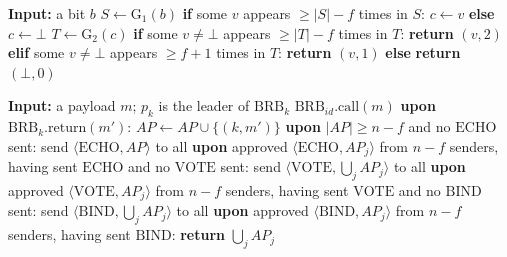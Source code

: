 \begin{algorithm}
    \caption{The two-gather graded agreement, Algorithm~4 of Attiya, Flam and
      Welch \cite{AFW25} in its case $R \ge 2$, at $R = 2$, with the grade
      computed from the second gather's counts in place of the
      approximate-agreement subroutine of its lines~7 and~8 (D24).
      G is a gather instance; the first carries bits, the second carries
      bits-or-$\bot$.}
    \label{alg:gbca-gather}
    \begin{algorithmic}
        \State \textbf{Input:} a bit $b$
        \medskip
        \State $S \gets \mathrm{G}_1(b)$
        \State \textbf{if} some $v$ appears $\ge |S| - f$ times in $S$:
          $c \gets v$ \textbf{else} $c \gets \bot$
        \State $T \gets \mathrm{G}_2(c)$
        \State \textbf{if} some $v \ne \bot$ appears $\ge |T| - f$ times in $T$:
          \textbf{return} $(v, 2)$
        \State \textbf{elif} some $v \ne \bot$ appears $\ge f + 1$ times in $T$:
          \textbf{return} $(v, 1)$ 
        \State \textbf{else} \textbf{return} $(\bot, 0)$
    \end{algorithmic}
\end{algorithm}

\begin{algorithm}
    \caption{The gather implementation, Algorithm~4 of the source
      blueprint~\cite{LeslieBP}, which is Algorithm~5 of \cite{AFW25} in its
      binding form: the $\mathrm{ECHO}$, $\mathrm{VOTE}$ and $\mathrm{BIND}$
      sends and the return are that algorithm's phases~2, 3 and~4 and its
      output, where the non-binding form stops one phase earlier.
      $n$ reliable-broadcast instances carry the inputs; $\mathrm{ECHO}$,
      $\mathrm{VOTE}$ and $\mathrm{BIND}$ are sent to all.
      A set of (process, payload) pairs is \emph{approved} when every pair is
      a delivered broadcast.
      Each send waits for the sender's own send at the level below, which is
      the order of the sends of Algorithm~5 of~\cite{AFW25} (D35).}
    \label{alg:gather-brb}
    \begin{algorithmic}
        \State \textbf{Input:} a payload $m$; $p_k$ is the leader of
          $\mathrm{BRB}_k$ \medskip
        \State $\mathrm{BRB}_{id}.\mathrm{call}(m)$
        \State \textbf{upon} $\mathrm{BRB}_k.\mathrm{return}(m')$:
          $AP \gets AP \cup \{(k, m')\}$
        \State \textbf{upon} $|AP| \ge n - f$ and no $\mathrm{ECHO}$ sent:
          send $\langle \mathrm{ECHO}, AP \rangle$ to all
        \State \textbf{upon} approved $\langle \mathrm{ECHO}, AP_j \rangle$
          from $n - f$ senders, having sent $\mathrm{ECHO}$ and no $\mathrm{VOTE}$ sent: send $\langle \mathrm{VOTE}, \bigcup_j AP_j \rangle$ to all
        \State \textbf{upon} approved $\langle \mathrm{VOTE}, AP_j \rangle$
          from $n - f$ senders, having sent $\mathrm{VOTE}$ and no $\mathrm{BIND}$ sent: send $\langle \mathrm{BIND}, \bigcup_j AP_j \rangle$ to all
        \State \textbf{upon} approved $\langle \mathrm{BIND}, AP_j \rangle$
          from $n - f$ senders, having sent $\mathrm{BIND}$: \textbf{return} $\bigcup_j AP_j$
    \end{algorithmic}
\end{algorithm}


